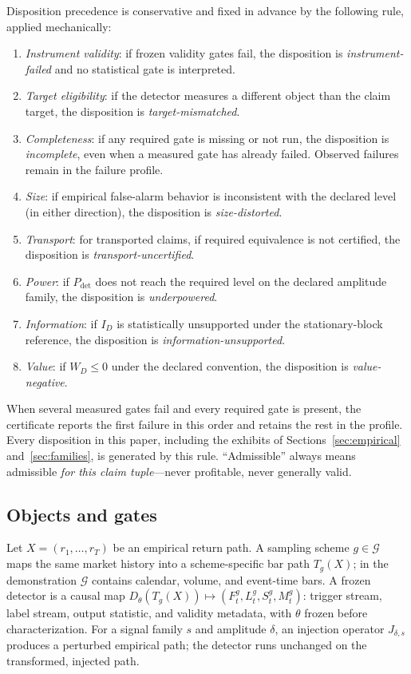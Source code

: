 \documentclass[3p]{elsarticle}
\newcommand{\Pdet}{\ensuremath{P_{\mathrm{det}}}}
\begin{document}
Disposition precedence is conservative and fixed in advance by the following
rule, applied mechanically:
\begin{enumerate}[leftmargin=2.2em,itemsep=0.15em]
\item \emph{Instrument validity}: if frozen validity gates fail, the
disposition is \emph{instrument-failed} and no statistical gate is
interpreted.
\item \emph{Target eligibility}: if the detector measures a different object
than the claim target, the disposition is \emph{target-mismatched}.
\item \emph{Completeness}: if any required gate is missing or not run, the
disposition is \emph{incomplete}, even when a measured gate has already
failed. Observed failures remain in the failure profile.
\item \emph{Size}: if empirical false-alarm behavior is inconsistent with the
declared level (in either direction), the disposition is
\emph{size-distorted}.
\item \emph{Transport}: for transported claims, if required equivalence is
not certified, the disposition is \emph{transport-uncertified}.
\item \emph{Power}: if $\Pdet$ does not reach the required level on the
declared amplitude family, the disposition is \emph{underpowered}.
\item \emph{Information}: if $I_D$ is statistically unsupported under the
stationary-block reference, the disposition is
\emph{information-unsupported}.
\item \emph{Value}: if $W_D\le0$ under the declared convention, the
disposition is \emph{value-negative}.
\end{enumerate}
When several measured gates fail and every required gate is present, the
certificate reports the first failure in this order and retains the rest in
the profile. Every disposition in this paper,
including the exhibits of Sections~\ref{sec:empirical}
and~\ref{sec:families}, is generated by this rule. ``Admissible'' always
means admissible \emph{for this claim tuple}---never profitable, never
generally valid.

\subsection{Objects and gates}

Let $X=(r_1,\ldots,r_T)$ be an empirical return path. A sampling scheme
$g\in\mathcal{G}$ maps the same market history into a scheme-specific bar
path $T_g(X)$; in the demonstration $\mathcal{G}$ contains calendar, volume,
and event-time bars. A frozen detector is a causal map
$D_\theta(T_g(X)) \mapsto (F_t^g,L_t^g,S_t^g,M_t^g)$: trigger stream, label
stream, output statistic, and validity metadata, with $\theta$ frozen before
characterization. For a signal family $s$ and amplitude $\delta$, an
injection operator $J_{\delta,s}$ produces a perturbed empirical path; the
detector runs unchanged on the transformed, injected path.
\end{document}
